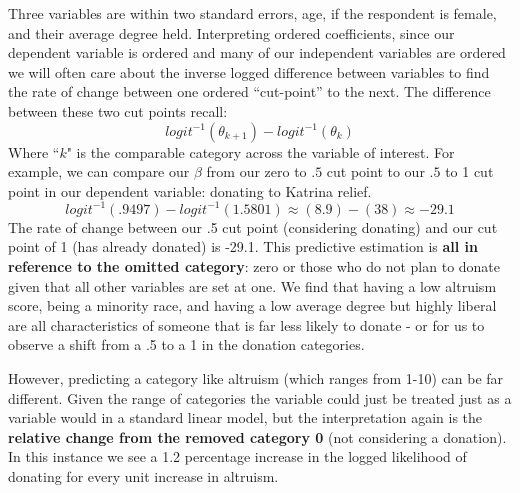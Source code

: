 \documentclass[12pt]{article}\usepackage[]{graphicx}\usepackage[]{color}
\begin{document}
\begin{flushleft}
Three variables are within two standard errors, age, if the respondent is female, and their average degree held. Interpreting ordered coefficients, since our dependent variable is ordered and many of our independent variables are ordered we will often care about the inverse logged difference between variables to find the rate of change between one ordered ``cut-point'' to the next. The difference between these two cut points recall:\\
\begin{equation}
logit^{-1} (\theta_{k+1}) - logit^{-1}(\theta_k)
\end{equation}
Where ``$k$" is the comparable category across the variable of interest. For example, we can compare our $\beta$ from our zero to $.5$ cut point to our $.5$ to 1 cut point in our dependent variable: donating to Katrina relief.
\begin{equation}
logit^{-1} (.9497) - logit^{-1}(1.5801) \approx (8.9) - (38) \approx   -29.1
\end{equation}
The rate of change between our .5 cut point (considering donating) and our cut point of 1 (has already donated) is -29.1. This predictive estimation is \textbf{all in reference to the omitted category}: zero or those who do not plan to donate given that all other variables are set at one. We find that having a low altruism score, being a minority race, and having a low average degree but highly liberal are all characteristics of someone that is far less likely to donate - or for us to observe a shift from a .5 to a 1 in the donation categories.

However, predicting a category like altruism (which ranges from 1-10) can be far different. Given the range of categories the variable could just be treated just as a variable would in a standard linear model, but the interpretation again is the \textbf{relative change from the removed category 0} (not considering a donation). In this instance we see a 1.2 percentage increase in the logged likelihood of donating for every unit increase in altruism. \\


\end{flushleft}
\end{document}
